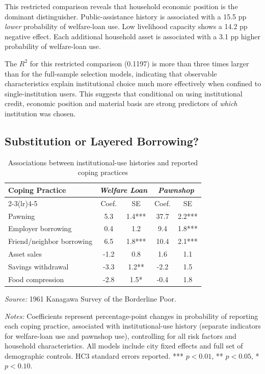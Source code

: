 \documentclass[12pt]{article}
\begin{document}
This restricted comparison reveals that household economic position is the dominant distinguisher. Public-assistance history is associated with a 15.5 pp \textit{lower} probability of welfare-loan use. Low livelihood capacity shows a 14.2 pp negative effect. Each additional household asset is associated with a 3.1 pp higher probability of welfare-loan use.

The $R^2$ for this restricted comparison (0.1197) is more than three times larger than for the full-sample selection models, indicating that observable characteristics explain institutional choice much more effectively when confined to single-institution users. This suggests that conditional on using institutional credit, economic position and material basis are strong predictors of \textit{which} institution was chosen.

\subsection{Substitution or Layered Borrowing?}

\begin{table}[htbp]
\centering
\caption{Associations between institutional-use histories and reported coping practices}
\label{tab:coping}
\begin{threeparttable}
\begin{tabular}{@{\extracolsep{6pt}}lcccc@{}}
\toprule
Coping Practice & \multicolumn{2}{c}{\textit{Welfare Loan}} & \multicolumn{2}{c}{\textit{Pawnshop}} \\
\cmidrule(lr){2-3}\cmidrule(lr){4-5}
 & Coef. & SE & Coef. & SE \\
\midrule
Pawning & 5.3 & 1.4*** & 37.7 & 2.2*** \\
Employer borrowing & 0.4 & 1.2 & 9.4 & 1.8*** \\
Friend/neighbor borrowing & 6.5 & 1.8*** & 10.4 & 2.1*** \\
Asset sales & -1.2 & 0.8 & 1.6 & 1.1 \\
Savings withdrawal & -3.3 & 1.2** & -2.2 & 1.5 \\
Food compression & -2.8 & 1.5* & -0.4 & 1.8 \\
\bottomrule
\end{tabular}
\begin{tablenotes}
\small
\item \textit{Source:} 1961 Kanagawa Survey of the Borderline Poor.
\item \textit{Notes:} Coefficients represent percentage-point changes in probability of reporting each coping practice, associated with institutional-use history (separate indicators for welfare-loan use and pawnshop use), controlling for all risk factors and household characteristics. All models include city fixed effects and full set of demographic controls. HC3 standard errors reported. *** $p<0.01$, ** $p<0.05$, * $p<0.10$.
\end{tablenotes}
\end{threeparttable}
\end{table}
\end{document}
